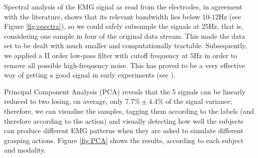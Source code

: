 Spectral analysis of the EMG signal as read from the electrodes, in
agreement with the literature, shows that its relevant bandwidth lies
below $10$-$12$Hz (see Figure \ref{fig:spectra}), so we could safely
subsample the signals at $25$Hz, that is, considering one sample in
four of the original data stream. This made the data set to be dealt
with much smaller and computationally tractable. Subsequently, we
applied a II order low-pass filter with cutoff frequency at $5$Hz in
order to remove all possible high-frequency noise. This has proved to
be a very effective way of getting a good signal in early experiments
(see \cite{2008.Neurorob}).

Principal Component Analysis (PCA) reveals that the 5 signals can be
linearly reduced to two losing, on average, only $7.7\% \pm 4.4\%$ of
the signal variance; therefore, we can visualise the samples, tagging
them according to the labels (and therefore according to the action)
and visually detecting how well the subjects can produce different EMG
patterns when they are asked to simulate different grasping
actions. Figure \ref{fig:PCA} shows the results, according to each
subject and modality.


